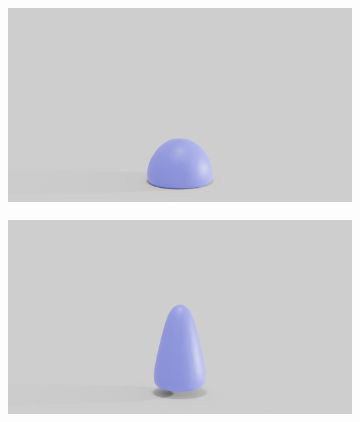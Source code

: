 \begin{figure}[htp!]
\begin{subfigure}{.16\linewidth}
		\label{sfig:ball-0495-4}
	\end{subfigure}%
	\begin{subfigure}{.16\linewidth}
		\centering
		{\includegraphics[width=2.0\textwidth]{images/soft_ball/0495/0400.jpg}}
		\label{sfig:ball-0495-5}
	\end{subfigure}%
	\begin{subfigure}{.16\linewidth}
		\centering
		{\includegraphics[width=2.0\textwidth]{images/soft_ball/0495/0450.jpg}}
		\label{sfig:ball-0495-6}
	\end{subfigure}\hfill
	\begin{subfigure}{.03\linewidth}
	\end{subfigure}%
	\begin{subfigure}{.16\linewidth}
		\centering

\end{subfigure}
\end{figure}
